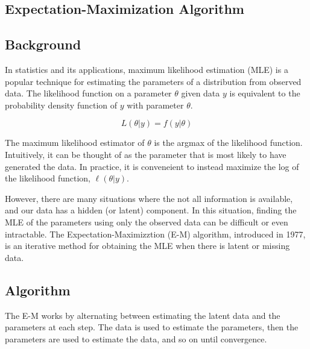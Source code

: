 \documentclass[14pt]{article}
\begin{document}

\begin{center}
\section*{Expectation-Maximization Algorithm}

\subsection*{Background}
\end{center}

In statistics and its applications, maximum likelihood estimation (MLE) is a popular technique for estimating the parameters of a distribution from observed data. The likelihood function on a parameter $\theta$ given data $y$ is equivalent to the probability density function of $y$ with parameter $\theta$.

$$L(\theta|y) = f(y|\theta)$$

The maximum likelihood estimator of $\theta$ is the argmax of the likelihood function.  Intuitively, it can be thought of as the parameter that is most likely to have generated the data.  In practice, it is conveneient to instead maximize the log of the likelihood function, $\ell(\theta|y)$.

However, there are many situations where the not all information is available, and our data has a hidden (or latent) component.  In this situation, finding the MLE of the parameters using only the observed data can be difficult or even intractable.  The Expectation-Maximizztion (E-M) algorithm, introduced in 1977, is an iterative method for obtaining the MLE when there is latent or missing data.

\begin{center}
\subsection*{Algorithm}
\end{center}

The E-M works by alternating between estimating the latent data and the parameters at each step.  The data is used to estimate the parameters, then the parameters are used to estimate the data, and so on until convergence.
\end{document}
